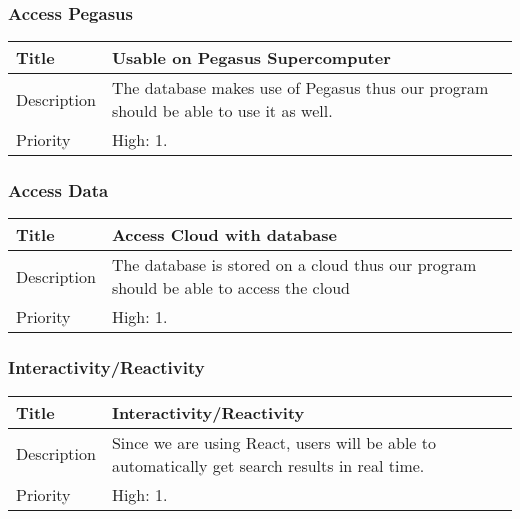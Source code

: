 \subsubsection{Access Pegasus}
  \begin{table}[h!]
    \begin{tabularx}{\textwidth}{|l|X|}
      \hline
      Title       & Usable on Pegasus Supercomputer \\ \hline
      Description & The database makes use of Pegasus thus our program should be
                    able to use it as well. \\ \hline
      Priority    & High: 1. \\ \hline
    \end{tabularx}
  \end{table}

\subsubsection{Access Data}
  \begin{table}[h!]
    \begin{tabularx}{\textwidth}{|l|X|}
      \hline
      Title        & Access Cloud with database \\ \hline
      Description  & The database is stored on a cloud thus our program should
                     be able to access the cloud \\ \hline
      Priority     & High: 1. \\ \hline
    \end{tabularx}
  \end{table}

\subsubsection{Interactivity/Reactivity}
  \begin{table}[h!]
    \begin{tabularx}{\textwidth}{|l|X|}
      \hline
      Title        & Interactivity/Reactivity \\ \hline
      Description  & Since we are using React, users will be able to automatically
                       get search results in real time. \\ \hline
      Priority     & High: 1. \\ \hline
    \end{tabularx}
  \end{table}
